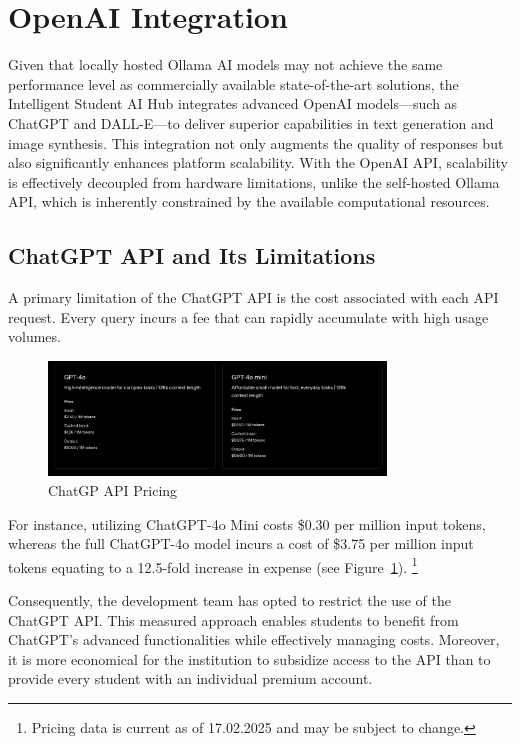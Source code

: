 \section{OpenAI Integration}

Given that locally hosted Ollama AI models may not achieve the same performance level as commercially available state-of-the-art solutions, 
the Intelligent Student AI Hub integrates advanced OpenAI models—such as ChatGPT and DALL-E—to deliver superior capabilities in text generation and image synthesis. 
This integration not only augments the quality of responses but also significantly enhances platform scalability. With the OpenAI API, 
scalability is effectively decoupled from hardware limitations, unlike the self-hosted Ollama API, which is inherently constrained by the available computational 
resources.

\subsection{ChatGPT API and Its Limitations}

A primary limitation of the ChatGPT API is the cost associated with each API request. 
Every query incurs a fee that can rapidly accumulate with high usage volumes. 

\begin{figure}[H]
    \centering
    \includegraphics[width=0.8\textwidth]{figures/ChatGPT-API_Pricing.png}
    \caption{ChatGP API Pricing}
    \label{fig:chatgpt_api_integration}
\end{figure}

\cite{ChatGPT-API-Pricing}

For instance, utilizing ChatGPT-4o Mini costs \$0.30 per million input tokens, 
whereas the full ChatGPT-4o model incurs a cost of \$3.75 per million input tokens equating to a 12.5-fold increase in expense 
(see Figure~\ref{fig:chatgpt_api_integration}).
\footnote{Pricing data is current as of 17.02.2025 and may be subject to change.} 

Consequently, the development team has opted to restrict the use of the ChatGPT API. 
This measured approach enables students to benefit from ChatGPT’s advanced functionalities while effectively managing costs. 
Moreover, it is more economical for the institution to subsidize access to the API than to provide every student with an individual premium account.

